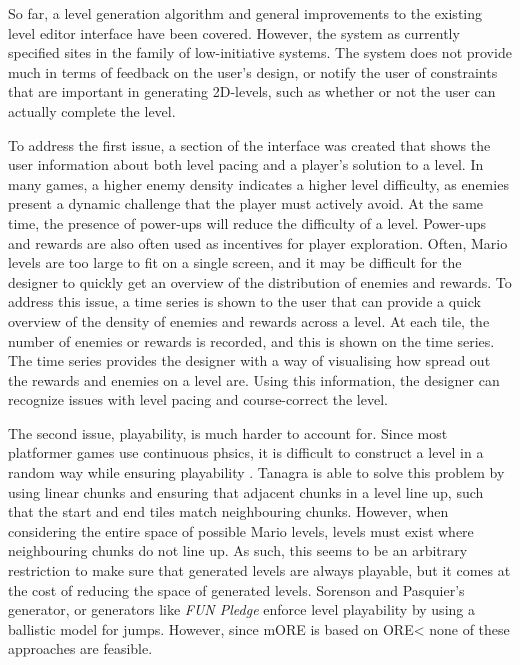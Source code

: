 
So far, a level generation algorithm and general improvements to the existing level editor
interface have been covered. However, the system as currently specified sites in the 
family of low-initiative systems. The system does not provide much in terms of feedback on
the user's design, or notify the user of constraints that are important in generating 
2D-levels, such as whether or not the user can actually complete the level.

To address the first issue, a section of the interface was created that shows the user
information about both level pacing and a player's solution to a level. In many games,
a higher enemy density indicates a higher level difficulty, as enemies present a dynamic
challenge that the player must actively avoid. At the same time, the presence of power-ups
will reduce the difficulty of a level. Power-ups and rewards are also often used as
incentives for player exploration. Often, Mario levels are too large to fit on a single 
screen, and it may be difficult for the designer to quickly get an overview of the
distribution of enemies and rewards. To address this issue, a time series is shown to the
user that can provide a quick overview of the density of enemies and rewards across a
level. At each tile, the number of enemies or rewards is recorded, and this is shown on
the time series. The time series provides the designer with a way of visualising how
spread out the rewards and enemies on a level are. Using this information, the designer can
recognize issues with level pacing and course-correct the level.

The second issue, playability, is much harder to account for. Since most platformer games
use continuous phsics, it is difficult to construct a level in a random way while ensuring
playability \cite{smith2010}. Tanagra is able to solve this problem by using linear chunks 
and ensuring that adjacent chunks in a level line up, such that the start and end tiles
match neighbouring chunks. However, when considering the entire space of possible Mario
levels, levels must exist where neighbouring chunks do not line up. As such, this seems to
be an arbitrary restriction to make sure that generated levels are always playable, but it
comes at the cost of reducing the space of generated levels. Sorenson and Pasquier's
generator, or generators like \emph{FUN Pledge} enforce level playability by using a ballistic
model for jumps. However, since mORE is based on ORE< none of these approaches are feasible.

